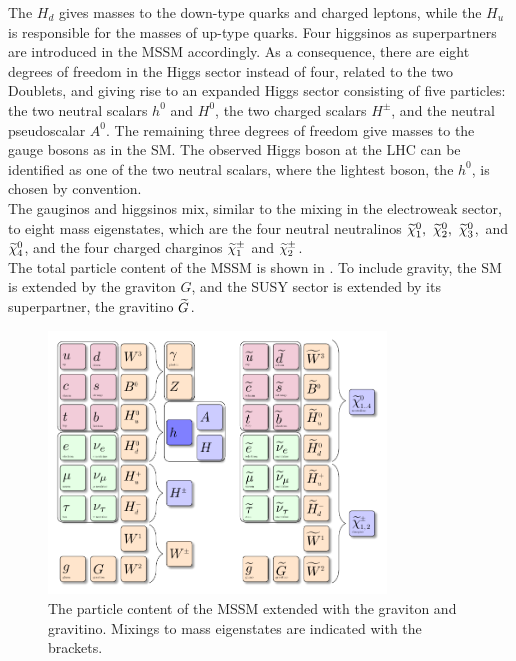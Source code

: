 The $H_d$ gives masses to the down-type quarks and charged leptons, while the $H_u$ is responsible for the masses of up-type quarks. Four higgsinos as superpartners are introduced in the MSSM accordingly. As a consequence, there are eight degrees of freedom in the Higgs sector instead of four, related to the two Doublets, and giving rise to an expanded Higgs sector consisting of five particles: the two neutral scalars $h^0$ and $H^0$, the two charged scalars $H^{\pm}$, and the neutral pseudoscalar $A^0$. The remaining three degrees of freedom give masses to the gauge bosons as in the SM. The observed Higgs boson at the LHC can be identified as one of the two neutral scalars, where the lightest boson, the $h^0$, is chosen by convention.\\
The gauginos and higgsinos mix, similar to the mixing in the electroweak sector, to eight mass eigenstates, which are the four neutral neutralinos $\widetilde{\chi}^{0}_{1},~\widetilde{\chi}^{0}_{2},~\widetilde{\chi}^{0}_{3}$,~and $\widetilde{\chi}^{0}_{4}$, and the four charged charginos $\widetilde{\chi}^\pm_{1}$ and $\widetilde{\chi}^{\pm}_{2}$.\\
The total particle content of the MSSM is shown in . To include gravity, the SM is extended by the graviton $G$, and the SUSY sector is extended by its superpartner, the gravitino $\widetilde{G}$.

\begin{figure}[tbp]
 \centering
 \includegraphics[width=0.8\textwidth]{figures/general/MSSM}
 \caption{The particle content of the MSSM extended with the graviton and gravitino. Mixings to mass eigenstates are indicated with the brackets.}
 \label{fig:mssm}
\end{figure}

